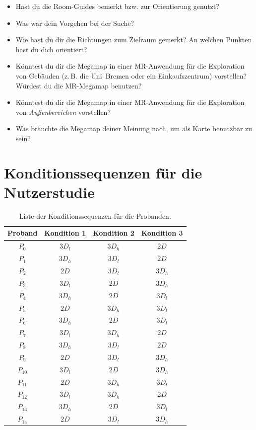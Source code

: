 \begin{appendices}
\begin{itemize}
        \item Hast du die Room-Guides bemerkt bzw. zur Orientierung genutzt?
        
        \item Was war dein Vorgehen bei der Suche?
        
        \item Wie hast du dir die Richtungen zum Zielraum gemerkt?
        An welchen Punkten hast du dich orientiert?
        
        \item Könntest du dir die Megamap in einer MR-Anwendung für die Exploration von Gebäuden (z.\,B. die Uni~Bremen oder ein Einkaufszentrum) vorstellen?
        Würdest du die MR-Megamap benutzen?
        
        \item Könntest du dir die Megamap in einer MR-Anwendung für die Exploration von \emph{Außenbereichen} vorstellen?
        
        \item Was bräuchte die Megamap deiner Meinung nach, um als Karte benutzbar zu sein?
    \end{itemize}
    
    \chapter{Konditionssequenzen für die Nutzerstudie}
    \begin{table}[h!]
        \centering
        \caption{Liste der Konditionssequenzen für die Probanden.}
        \label{appendix:condition_sequences}
        \begin{tabular}{cccc}\toprule
            Proband & Kondition 1 & Kondition 2 & Kondition 3 \\\midrule
            $P_0$ & $3D_l$ & $3D_h$ & $2D$ \\
            $P_1$ & $3D_h$ & $3D_l$ & $2D$ \\
            $P_2$ & $2D$ & $3D_l$ & $3D_h$ \\
            $P_3$ & $3D_l$ & $2D$ & $3D_h$ \\
            $P_4$ & $3D_h$ & $2D$ & $3D_l$ \\
            $P_5$ & $2D$ & $3D_h$ & $3D_l$ \\
            $P_6$ & $3D_h$ & $2D$ & $3D_l$ \\
            $P_7$ & $3D_l$ & $3D_h$ & $2D$ \\
            $P_8$ & $3D_h$ & $3D_l$ & $2D$ \\
            $P_9$ & $2D$ & $3D_l$ & $3D_h$ \\
            $P_{10}$ & $3D_l$ & $2D$ & $3D_h$ \\
            $P_{11}$ & $2D$ & $3D_h$ & $3D_l$ \\
            $P_{12}$ & $3D_l$ & $3D_h$ & $2D$ \\
            $P_{13}$ & $3D_h$ & $2D$ & $3D_l$ \\
            $P_{14}$ & $2D$ & $3D_l$ & $3D_h$ \\\bottomrule        
        \end{tabular}
    \end{table}


\end{appendices}
